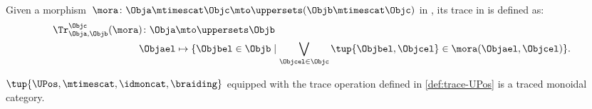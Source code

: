 \begin{definition}
    \label{def:trace-UPos}
    Given a morphism~$\mora\colon \Obja \mtimescat \Objc \mto \uppersets(\Objb\mtimescat \Objc)$ in \UPos, its trace in is defined as:
    \begin{equation}
        \begin{aligned}
            \Tr_{\Obja,\Objb}^{\Objc}(\mora)\colon \Obja &\mto \uppersets \Objb\\
            \Objael & \mapsto \{\Objbel \in \Objb \mid \bigvee_{\Objcel \in \Objc}\tup{\Objbel, \Objcel}\in \mora(\Objael,\Objcel)\}.
        \end{aligned}
    \end{equation}
\end{definition}
\begin{lemma}\label{lem:UPos-is-traced}
  $\tup{\UPos,\mtimescat, \idmoncat,\braiding}$ equipped with the trace operation defined in \cref{def:trace-UPos} is a traced monoidal category.
\end{lemma}
